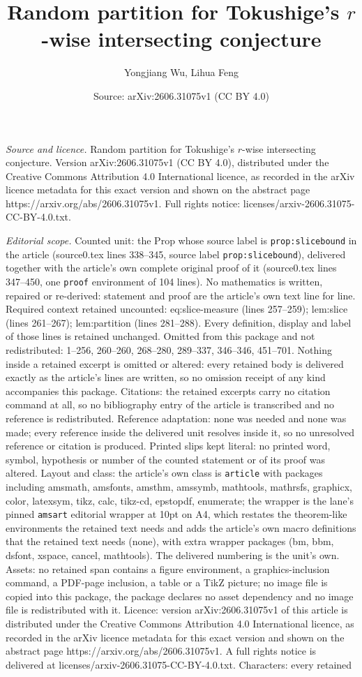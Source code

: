 \documentclass[10pt,a4paper]{amsart}
\title[Random partition for Tokushige's $r$-wise intersecting conje]{Random partition for Tokushige's $r$-wise intersecting conjecture}
\author{Yongjiang Wu, Lihua Feng}
\date{Source: arXiv:2606.31075v1 (CC BY 4.0)}
\begin{document}
\maketitle

\noindent\emph{Source and licence.} Random partition for Tokushige's $r$-wise intersecting conjecture. Version arXiv:2606.31075v1 (CC BY 4.0), distributed under the Creative Commons Attribution 4.0 International licence, as recorded in the arXiv licence metadata for this exact version and shown on the abstract page https://arxiv.org/abs/2606.31075v1. Full rights notice: licenses/arxiv-2606.31075-CC-BY-4.0.txt.\par\smallskip

\noindent\textit{Editorial scope.} Counted unit: the Prop whose source label is \texttt{prop:slicebound} in the article (source0.tex lines 338--345, source label \texttt{prop:slicebound}), delivered together with the article's own complete original proof of it (source0.tex lines 347--450, one \texttt{proof} environment of 104 lines). No mathematics is written, repaired or re-derived: statement and proof are the article's own text line for line. Required context retained uncounted: eq:slice-measure (lines 257--259); lem:slice (lines 261--267); lem:partition (lines 281--288). Every definition, display and label of those lines is retained unchanged. Omitted from this package and not redistributed: 1--256, 260--260, 268--280, 289--337, 346--346, 451--701. Nothing inside a retained excerpt is omitted or altered: every retained body is delivered exactly as the article's lines are written, so no omission receipt of any kind accompanies this package. Citations: the retained excerpts carry no citation command at all, so no bibliography entry of the article is transcribed and no reference is redistributed. Reference adaptation: none was needed and none was made; every reference inside the delivered unit resolves inside it, so no unresolved reference or citation is produced. Printed slips kept literal: no printed word, symbol, hypothesis or number of the counted statement or of its proof was altered. Layout and class: the article's own class is \texttt{article} with packages including amsmath, amsfonts, amsthm, amssymb, mathtools, mathrsfs, graphicx, color, latexsym, tikz, calc, tikz-cd, epstopdf, enumerate; the wrapper is the lane's pinned \texttt{amsart} editorial wrapper at 10pt on A4, which restates the theorem-like environments the retained text needs and adds the article's own macro definitions that the retained text needs (none), with extra wrapper packages (bm, bbm, dsfont, xspace, cancel, mathtools). The delivered numbering is the unit's own. Assets: no retained span contains a figure environment, a graphics-inclusion command, a PDF-page inclusion, a table or a TikZ picture; no image file is copied into this package, the package declares no asset dependency and no image file is redistributed with it. Licence: version arXiv:2606.31075v1 of this article is distributed under the Creative Commons Attribution 4.0 International licence, as recorded in the arXiv licence metadata for this exact version and shown on the abstract page https://arxiv.org/abs/2606.31075v1. A full rights notice is delivered at licenses/arxiv-2606.31075-CC-BY-4.0.txt. Characters: every retained 
\end{document}
